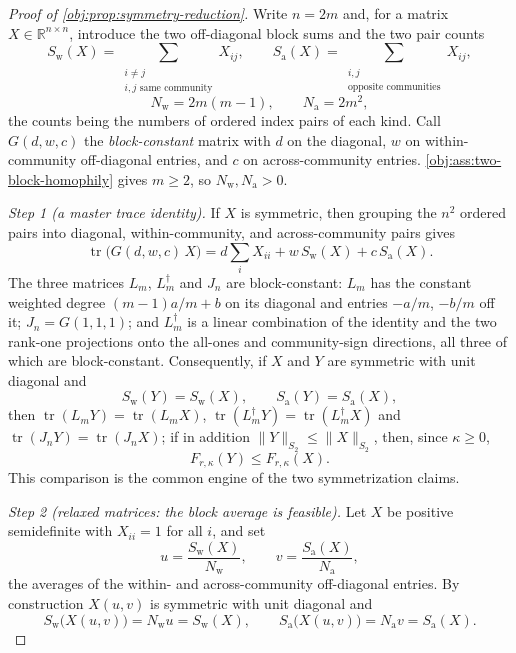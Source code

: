 \documentclass[11pt]{article}
\begin{document}
\begin{proof}[Proof of \cref{obj:prop:symmetry-reduction}]
Write \(n=2m\) and, for a matrix \(X\in\mathbb R^{n\times n}\), introduce the two off-diagonal block sums and the two pair counts
\[
S_{\mathrm{w}}(X)=\sum_{\substack{i\ne j\\ i,j\text{ same community}}}X_{ij},
\qquad
S_{\mathrm{a}}(X)=\sum_{\substack{i,j\\ \text{opposite communities}}}X_{ij},
\]
\[
N_{\mathrm{w}}=2m(m-1),
\qquad
N_{\mathrm{a}}=2m^2 ,
\]
the counts being the numbers of ordered index pairs of each kind.  Call \(G(d,w,c)\) the \emph{block-constant} matrix with \(d\) on the diagonal, \(w\) on within-community off-diagonal entries, and \(c\) on across-community entries.  \cref{obj:ass:two-block-homophily} gives \(m\ge2\), so \(N_{\mathrm{w}},N_{\mathrm{a}}>0\).

\emph{Step 1 (a master trace identity).}  If \(X\) is symmetric, then grouping the \(n^2\) ordered pairs into diagonal, within-community, and across-community pairs gives
\[
\operatorname{tr}\bigl(G(d,w,c)\,X\bigr)
=d\sum_{i}X_{ii}+w\,S_{\mathrm{w}}(X)+c\,S_{\mathrm{a}}(X).
\]
The three matrices \(L_m\), \(L_m^\dagger\) and \(J_n\) are block-constant: \(L_m\) has the constant weighted degree \((m-1)a/m+b\) on its diagonal and entries \(-a/m\), \(-b/m\) off it; \(J_n=G(1,1,1)\); and \(L_m^\dagger\) is a linear combination of the identity and the two rank-one projections onto the all-ones and community-sign directions, all three of which are block-constant.  Consequently, if \(X\) and \(Y\) are symmetric with unit diagonal and
\[
S_{\mathrm{w}}(Y)=S_{\mathrm{w}}(X),
\qquad
S_{\mathrm{a}}(Y)=S_{\mathrm{a}}(X),
\]
then \(\operatorname{tr}(L_mY)=\operatorname{tr}(L_mX)\), \(\operatorname{tr}(L_m^\dagger Y)=\operatorname{tr}(L_m^\dagger X)\) and \(\operatorname{tr}(J_nY)=\operatorname{tr}(J_nX)\); if in addition \(\|Y\|_{S_2}\le\|X\|_{S_2}\), then, since \(\kappa\ge0\),
\[
F_{r,\kappa}(Y)\le F_{r,\kappa}(X).
\]
This comparison is the common engine of the two symmetrization claims.

\emph{Step 2 (relaxed matrices: the block average is feasible).}  Let \(X\) be positive semidefinite with \(X_{ii}=1\) for all \(i\), and set
\[
u=\frac{S_{\mathrm{w}}(X)}{N_{\mathrm{w}}},
\qquad
v=\frac{S_{\mathrm{a}}(X)}{N_{\mathrm{a}}},
\]
the averages of the within- and across-community off-diagonal entries.  By construction \(X(u,v)\) is symmetric with unit diagonal and
\[
S_{\mathrm{w}}\bigl(X(u,v)\bigr)=N_{\mathrm{w}}u=S_{\mathrm{w}}(X),
\qquad
S_{\mathrm{a}}\bigl(X(u,v)\bigr)=N_{\mathrm{a}}v=S_{\mathrm{a}}(X).
\]


\end{proof}
\end{document}

